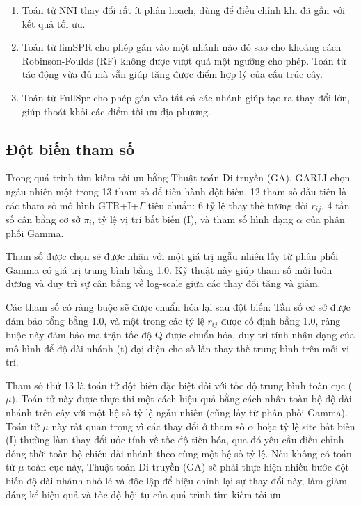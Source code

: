 \documentclass[12pt,a4paper]{report}
\begin{document}
\begin{enumerate}
    \item Toán tử NNI thay đổi rất ít phân hoạch, dùng để điều chỉnh khi đã gần với kết quả tối ưu.
    \item Toán tử limSPR cho phép gán vào một nhánh nào đó sao cho khoảng cách Robinson-Foulds (RF) không được vượt quá một ngưỡng cho phép. Toán tử tác động vừa đủ mà vẫn giúp tăng được điểm hợp lý của cấu trúc cây.
    \item Toán tử FullSpr cho phép gán vào tất cả các nhánh giúp tạo ra thay đổi lớn, giúp thoát khỏi các điểm tối ưu địa phương.
\end{enumerate}

\subsection{Đột biến tham số}

Trong quá trình tìm kiếm tối ưu bằng Thuật toán Di truyền (GA), GARLI chọn ngẫu nhiên một trong 13 tham số để tiến hành đột biến. 12 tham số đầu tiên là các tham số mô hình GTR+I+\(\Gamma\) tiêu chuẩn: 6 tỷ lệ thay thế tương đối \(r_{ij}\), 4 tần số cân bằng cơ sở \(\pi_i\), tỷ lệ vị trí bất biến (I), và tham số hình dạng \(\alpha\) của phân phối Gamma.

Tham số được chọn sẽ được nhân với một giá trị ngẫu nhiên lấy từ phân phối Gamma có giá trị trung bình bằng 1.0. Kỹ thuật này giúp tham số mới luôn dương và duy trì sự cân bằng về log-scale giữa các thay đổi tăng và giảm.

Các tham số có ràng buộc sẽ được chuẩn hóa lại sau đột biến: Tần số cơ sở được đảm bảo tổng bằng 1.0, và một trong các tỷ lệ \(r_{ij}\) được cố định bằng 1.0, ràng buộc này đảm bảo ma trận tốc độ Q được chuẩn hóa, duy trì tính nhận dạng của mô hình để độ dài nhánh (t) đại diện cho số lần thay thế trung bình trên mỗi vị trí.

Tham số thứ 13 là toán tử đột biến đặc biệt đối với tốc độ trung bình toàn cục (\(\mu\)). Toán tử này được thực thi một cách hiệu quả bằng cách nhân toàn bộ độ dài nhánh trên cây với một hệ số tỷ lệ ngẫu nhiên (cũng lấy từ phân phối Gamma). Toán tử \(\mu\) này rất quan trọng vì các thay đổi ở tham số \(\alpha\) hoặc tỷ lệ site bất biến (I) thường làm thay đổi ước tính về tốc độ tiến hóa, qua đó yêu cầu điều chỉnh đồng thời toàn bộ chiều dài nhánh theo cùng một hệ số tỷ lệ. Nếu không có toán tử \(\mu\) toàn cục này, Thuật toán Di truyền (GA) sẽ phải thực hiện nhiều bước đột biến độ dài nhánh nhỏ lẻ và độc lập để hiệu chỉnh lại sự thay đổi này, làm giảm đáng kể hiệu quả và tốc độ hội tụ của quá trình tìm kiếm tối ưu.
\end{document}
